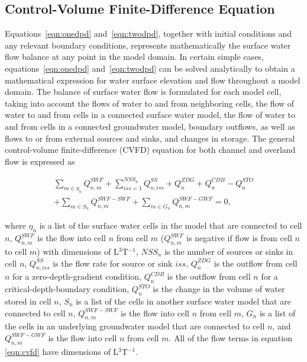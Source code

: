 \documentclass[fleqn]{article}
\begin{document}
\subsection{Control-Volume Finite-Difference Equation}
Equations~\ref{eqn:onedpd} and~\ref{eqn:twodpd}, together with initial conditions and any relevant boundary conditions, represents mathematically the surface water flow balance at any point in the model domain. In certain simple cases, equations~\ref{eqn:onedpd} and~\ref{eqn:twodpd} can be solved analytically to obtain a mathematical expression for water surface elevation and flow throughout a model domain. The balance of surface water flow is formulated for each model cell, taking into account the flows of water to and from neighboring cells, the flow of water to and from cells in a connected surface water model, the flow of water to and from cells in a connected groundwater model, boundary outflows, as well as flows to or from external sources and sinks, and changes in storage.  The general control-volume finite-difference (CVFD) equation for both channel and overland flow is expressed as

\begin{equation}
  \label{eqn:cvfd}
  \begin{split}
  \sum \limits_{m \in \eta_{n}} Q_{n,m}^{SWF}
  + \sum \limits_{iss=1}^{NSS_n} Q_{n,iss}^{SS}
  + Q_n^{ZDG}
  + Q_n^{CDB}
  - Q_n^{STO} \\
  + \sum \limits_{m \in S_{n}} Q_{n,m}^{SWF-SWF}
  + \sum \limits_{m \in G_{n}} Q_{n,m}^{SWF-GWF}
  = 
  0,
  \end{split}
\end{equation}

\noindent where 
$\eta_{n}$ is a list of the surface water cells in the model that are connected to cell $n$, 
$Q_{n,m}^{SWF}$ is the flow into cell $n$ from cell $m$ ($Q_{n,m}^{SWF}$ is negative if flow is from cell $n$ to cell $m$) with dimensions of L$^{3}$T$^{-1}$, 
$NSS_n$ is the number of sources or sinks in cell $n$, $Q_{n,iss}^{SS}$ is the flow rate for source or sink $iss$, 
$Q_n^{ZDG}$ is the outflow from cell $n$ for a zero-depth-gradient condition, 
$Q_n^{CDB}$ is the outflow from cell $n$ for a critical-depth-boundary condition,
$Q_n^{STO}$ is the change in the volume of water stored in cell $n$,
$S_{n}$ is a list of the cells in another surface water model that are connected to cell $n$,
$Q_{n,m}^{SWF-SWF}$ is the flow into cell $n$ from cell $m$, 
$G_{n}$ is a list of the cells in an underlying groundwater model that are connected to cell $n$,
and $Q_{n,m}^{SWF-GWF}$ is the flow into cell $n$ from cell $m$.  
All of the flow terms in equation \ref{eqn:cvfd} have dimensions of L$^{3}$T$^{-1}$.
\end{document}

